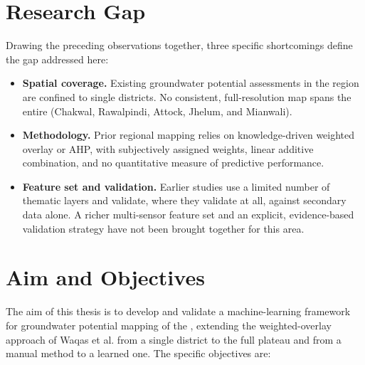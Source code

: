 \section{Research Gap}
\label{sec:gap}

Drawing the preceding observations together, three specific shortcomings define
the gap addressed here:

\begin{itemize}
  \item \textbf{Spatial coverage.} Existing groundwater potential assessments in
        the region are confined to single districts. No consistent,
        full-resolution map spans the entire \studyarea{} (Chakwal, Rawalpindi,
        Attock, Jhelum, and Mianwali).
  \item \textbf{Methodology.} Prior regional mapping relies on knowledge-driven
        weighted overlay or AHP, with subjectively assigned weights, linear
        additive combination, and no quantitative measure of predictive
        performance.
  \item \textbf{Feature set and validation.} Earlier studies use a limited
        number of thematic layers and validate, where they validate at all,
        against secondary data alone. A richer multi-sensor feature set and an
        explicit, evidence-based validation strategy have not been brought
        together for this area.
\end{itemize}

\section{Aim and Objectives}
\label{sec:objectives}

The aim of this thesis is to develop and validate a machine-learning framework
for groundwater potential mapping of the \studyarea{}, extending the
weighted-overlay approach of Waqas et al. \cite{waqas2022chakwal} from a single
district to the full plateau and from a manual method to a learned one. The
specific objectives are:

